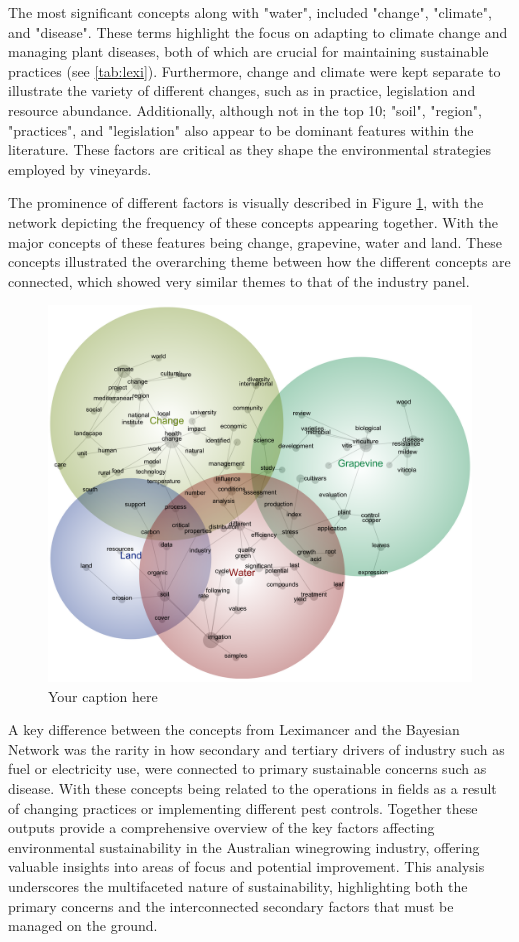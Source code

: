 The most significant concepts along with "water", included "change", "climate", and "disease". These terms highlight the focus on adapting to climate change and managing plant diseases, both of which are crucial for maintaining sustainable practices (see \ref{tab:lexi}). Furthermore, change and climate were kept separate to illustrate the variety of different changes, such as in practice, legislation and resource abundance. Additionally, although not in the top 10; "soil", "region", "practices", and "legislation" also appear to be dominant features within the literature. These factors are critical as they shape the environmental strategies employed by vineyards.

The prominence of different factors is visually described in Figure \ref{fig:lexi}, with the network depicting the frequency of these concepts appearing together. With the major concepts of these features being change, grapevine, water and land. These concepts illustrated the overarching theme between how the different concepts are connected, which showed very similar themes to that of the industry panel.

\begin{figure}[h]
    \centering
    \includegraphics[width=\linewidth]{Winegrowing-concept-map}
    \caption{Your caption here}
    \label{fig:lexi}
\end{figure}

A key difference between the concepts from Leximancer and the Bayesian Network was the rarity in how secondary and tertiary drivers of industry such as fuel or electricity use, were connected to primary sustainable concerns such as disease. With these concepts being related to the operations in fields as a result of changing practices or implementing different pest controls. Together these outputs provide a comprehensive overview of the key factors affecting environmental sustainability in the Australian winegrowing industry, offering valuable insights into areas of focus and potential improvement. This analysis underscores the multifaceted nature of sustainability, highlighting both the primary concerns and the interconnected secondary factors that must be managed on the ground.

